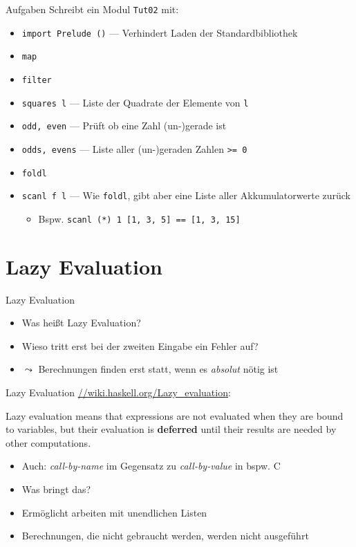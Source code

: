 \documentclass{beamer}
\newcommand{\code}[1]{
	\begin{mdframed}
		
	\end{mdframed}
}
\begin{document}
\begin{frame}{Aufgaben}
	Schreibt ein Modul \texttt{Tut02} mit:

	\begin{itemize}
		\item \texttt{import Prelude ()} --- Verhindert Laden der Standardbibliothek
		\item \texttt{map}
		\item \texttt{filter}
		\item \texttt{squares l} --- Liste der Quadrate der Elemente von \texttt{l}
		\item \texttt{odd, even} --- Prüft ob eine Zahl (un-)gerade ist
		\item \texttt{odds, evens} --- Liste aller (un-)geraden Zahlen \texttt{>= 0}
		\item \texttt{foldl}
		\item \texttt{scanl f l} --- Wie \texttt{foldl}, gibt aber eine Liste aller Akkumulatorwerte zurück
		\begin{itemize}
			\item Bspw. \texttt{scanl (*) 1 [1, 3, 5] == [1, 3, 15]}
		\end{itemize}
	\end{itemize}
\end{frame}

\section{Lazy Evaluation}

\begin{frame}{Lazy Evaluation}
	\code{code/ghci-lazy.output}

	\begin{itemize}
		\item Was heißt Lazy Evaluation?
		\item Wieso tritt erst bei der zweiten Eingabe ein Fehler auf?
		\pause
		\item $\leadsto$ Berechnungen finden erst statt, wenn es \emph{absolut} nötig ist
	\end{itemize}
\end{frame}

\begin{frame}{Lazy Evaluation}
	\url{//wiki.haskell.org/Lazy\_evaluation}:

	\begin{displayquote}
		Lazy evaluation means that expressions are not evaluated when they are bound to variables, but their evaluation is \textbf{deferred} until their results are needed by other computations.
	\end{displayquote}

	\begin{itemize}
		\item Auch: \emph{call-by-name} im Gegensatz zu \emph{call-by-value} in bspw. C
		\item Was bringt das?
		\pause
		\item Ermöglicht arbeiten mit unendlichen Listen
		\item Berechnungen, die nicht gebraucht werden, werden nicht ausgeführt
	\end{itemize}
\end{frame}
\end{document}
